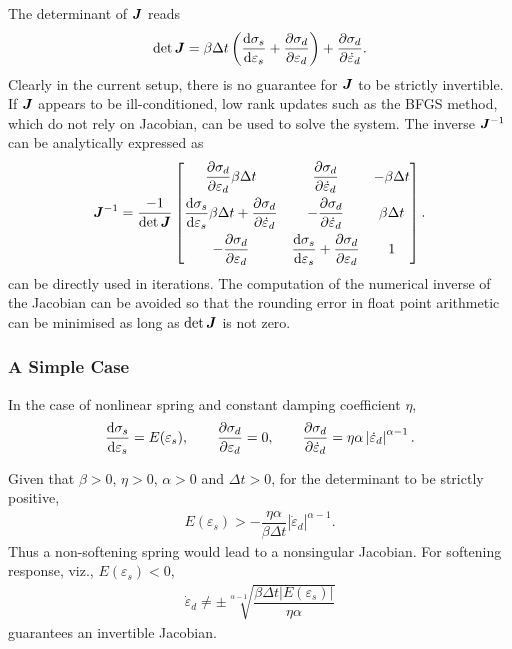 The determinant of $\bm{J}$ reads
\begin{gather}
\det{\bm{J}}=\beta\Delta{}t\left(\dfrac{\mathrm{d}\sigma_s}{\mathrm{d}\varepsilon_s}+\dfrac{\partial{\sigma_d}}{\partial{\varepsilon_d}}\right)+\dfrac{\partial{\sigma_d}}{\partial{\dot\varepsilon_d}}.
\end{gather}
Clearly in the current setup, there is no guarantee for $\bm{J}$ to be strictly invertible. If $\bm{J}$ appears to be ill-conditioned, low rank updates such as the BFGS method, which do not rely on Jacobian, can be used to solve the system. The inverse $\bm{J}^{-1}$ can be analytically expressed as
\begin{gather}\label{eq:inv_j}
\bm{J}^{-1}=\dfrac{-1}{\det{\bm{J}}}\begin{bmatrix}
	\dfrac{\partial{\sigma_d}}{\partial{\varepsilon_d}}\beta\Delta{}t                                               & \dfrac{\partial{\sigma_d}}{\partial{\dot\varepsilon_d}}                                       & -\beta\Delta{}t \\[3mm]
	\dfrac{\mathrm{d}\sigma_s}{\mathrm{d}\varepsilon_s}\beta\Delta{}t+\dfrac{\partial{\sigma_d}}{\partial{\dot\varepsilon_d}} & -\dfrac{\partial{\sigma_d}}{\partial{\dot\varepsilon_d}}                                      & \beta\Delta{}t  \\[3mm]
	-\dfrac{\partial{\sigma_d}}{\partial{\varepsilon_d}}                                                            & \dfrac{\mathrm{d}\sigma_s}{\mathrm{d}\varepsilon_s}+\dfrac{\partial{\sigma_d}}{\partial{\varepsilon_d}} & 1
\end{bmatrix}.
\end{gather}
 can be directly used in iterations. The computation of the numerical inverse of the Jacobian can be avoided so that the rounding error in float point arithmetic can be minimised as long as $\det{\bm{J}}$ is not zero.
\subsubsection{A Simple Case}
In the case of nonlinear spring and constant damping coefficient $\eta$,
\begin{gather}
\dfrac{\mathrm{d}\sigma_s}{\mathrm{d}\varepsilon_s}=E(\varepsilon_s),\qquad\dfrac{\partial{\sigma_d}}{\partial{\varepsilon_d}}=0,\qquad\dfrac{\partial{\sigma_d}}{\partial{\dot\varepsilon_d}}=\eta\alpha\left\lvert\dot\varepsilon_d\right\rvert^{\alpha-1}.
\end{gather}

Given that $\beta>0$, $\eta>0$, $\alpha>0$ and $\Delta{}t>0$, for the determinant to be strictly positive,
\begin{gather}
E(\varepsilon_s)>-\dfrac{\eta\alpha}{\beta\Delta{}t}\left\lvert\dot\varepsilon_d\right\rvert^{\alpha-1}.
\end{gather}
Thus a non-softening spring would lead to a nonsingular Jacobian. For softening response, viz., $E(\varepsilon_s)<0$,
\begin{gather}
\dot\varepsilon_d\neq\pm\sqrt[\alpha-1]{\dfrac{\beta\Delta{}t{}\left\lvert{}E(\varepsilon_s)\right\rvert}{\eta\alpha}}
\end{gather}
guarantees an invertible Jacobian.

